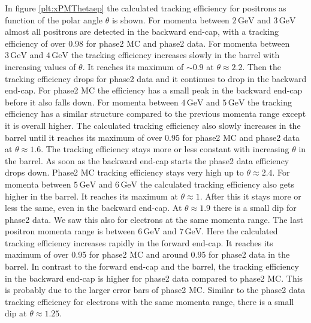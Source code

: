 \documentclass[a4paper,11pt,twosided,final,german,openbib,pdftex,listof=totoc,bibliography=totoc]{scrbook}
\begin{document}
In figure \ref{plt:xPMThetaep} the calculated tracking efficiency for positrons as function of the polar angle $\theta$ is shown. For momenta between $2\,\textrm{GeV}$ and $3\,\textrm{GeV}$ almost all positrons are detected in the backward end-cap, with a tracking efficiency of over 0.98 for phase2 MC and phase2 data. 
For momenta between $3\,\textrm{GeV}$ and $4\,\textrm{GeV}$ the tracking efficiency increases slowly in the barrel with increasing values of $\theta$. It reaches its maximum of $\sim 0.9$ at $\theta \approx 2.2$. Then the tracking efficiency drops for phase2 data and it continues to drop in the backward end-cap. For phase2 MC the efficiency has a small peak in the backward end-cap before it also falls down. 
For momenta between $4\,\textrm{GeV}$ and $5\,\textrm{GeV}$ the tracking efficiency has a similar structure compared to the previous momenta range except it is overall higher. The calculated tracking efficiency also slowly increases in the barrel until it reaches its maximum of over 0.95 for phase2 MC and phase2 data at $\theta \approx 1.6$. The tracking efficiency stays more or less constant with increasing $\theta$ in the barrel. As soon as the backward end-cap starts the phase2 data efficiency drops down. Phase2 MC tracking efficiency stays very high up to $\theta \approx 2.4$.
For momenta between $5\,\textrm{GeV}$ and $6\,\textrm{GeV}$ the calculated tracking efficiency also gets higher in the barrel. It reaches its maximum at $\theta \approx 1$. After this it stays more or less the same, even in the backward end-cap. At $\theta \approx 1.9$ there is a small dip for phase2 data. We saw this also for electrons at the same momenta range.
The last positron momenta range is between $6\,\textrm{GeV}$ and $7\,\textrm{GeV}$. Here the calculated tracking efficiency increases rapidly in the forward end-cap. It reaches its maximum of over 0.95 for phase2 MC and around 0.95 for phase2 data in the barrel. In contrast to the forward end-cap and the barrel, the tracking efficiency in the backward end-cap is higher for phase2 data compared to phase2 MC. This is probably due to the larger error bars of phase2 MC. Similar to the phase2 data tracking efficiency for electrons with the same momenta range, there is a small dip at $\theta \approx 1.25$.
\end{document}
